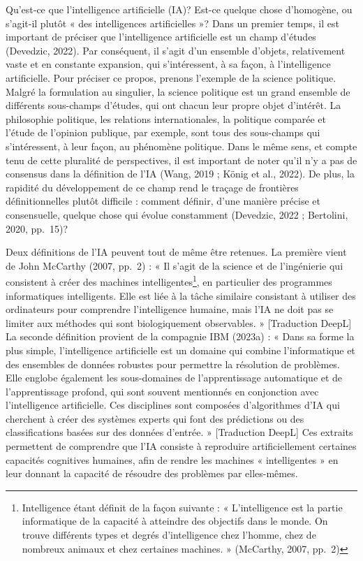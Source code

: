 \documentclass[
  letterpaper,
  DIV=11,
  numbers=noendperiod]{scrreprt}
\begin{document}
Qu'est-ce que l'intelligence artificielle (IA)? Est-ce quelque chose
d'homogène, ou s'agit-il plutôt « des intelligences artificielles »?
Dans un premier temps, il est important de préciser que l'intelligence
artificielle est un champ d'études (Devedzic, 2022). Par conséquent, il
s'agit d'un ensemble d'objets, relativement vaste et en constante
expansion, qui s'intéressent, à sa façon, à l'intelligence artificielle.
Pour préciser ce propos, prenons l'exemple de la science politique.
Malgré la formulation au singulier, la science politique est un grand
ensemble de différents sous-champs d'études, qui ont chacun leur propre
objet d'intérêt. La philosophie politique, les relations
internationales, la politique comparée et l'étude de l'opinion publique,
par exemple, sont tous des sous-champs qui s'intéressent, à leur façon,
au phénomène politique. Dans le même sens, et compte tenu de cette
pluralité de perspectives, il est important de noter qu'il n'y a pas de
consensus dans la définition de l'IA (Wang, 2019 ; König et al., 2022).
De plus, la rapidité du développement de ce champ rend le traçage de
frontières définitionnelles plutôt difficile : comment définir, d'une
manière précise et consensuelle, quelque chose qui évolue constamment
(Devedzic, 2022 ; Bertolini, 2020, pp.~15)?

Deux définitions de l'IA peuvent tout de même être retenues. La première
vient de John McCarthy (2007, pp.~2) : « Il s'agit de la science et de
l'ingénierie qui consistent à créer des machines
intelligentes\footnote{Intelligence étant définit de la façon suivante :
  « L'intelligence est la partie informatique de la capacité à atteindre
  des objectifs dans le monde. On trouve différents types et degrés
  d'intelligence chez l'homme, chez de nombreux animaux et chez
  certaines machines. » (McCarthy, 2007, pp.~2)}, en particulier des
programmes informatiques intelligents. Elle est liée à la tâche
similaire consistant à utiliser des ordinateurs pour comprendre
l'intelligence humaine, mais l'IA ne doit pas se limiter aux méthodes
qui sont biologiquement observables. » {[}Traduction DeepL{]} La seconde
définition provient de la compagnie IBM (2023a) : « Dans sa forme la
plus simple, l'intelligence artificielle est un domaine qui combine
l'informatique et des ensembles de données robustes pour permettre la
résolution de problèmes. Elle englobe également les sous-domaines de
l'apprentissage automatique et de l'apprentissage profond, qui sont
souvent mentionnés en conjonction avec l'intelligence artificielle. Ces
disciplines sont composées d'algorithmes d'IA qui cherchent à créer des
systèmes experts qui font des prédictions ou des classifications basées
sur des données d'entrée. » {[}Traduction DeepL{]} Ces extraits
permettent de comprendre que l'IA consiste à reproduire artificiellement
certaines capacités cognitives humaines, afin de rendre les machines «
intelligentes » en leur donnant la capacité de résoudre des problèmes
par elles-mêmes.
\end{document}
